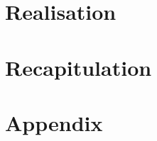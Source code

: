 


	
	
	
	
	\renewcommand{\contentsname}{Table of Content}
	\tableofcontents
	\newpage
	
	
	
	
	\part{Realisation}
	
	
	
	\part{Recapitulation}
	
	
	
	
	

	\part{Appendix}
	\appendix
	
	
